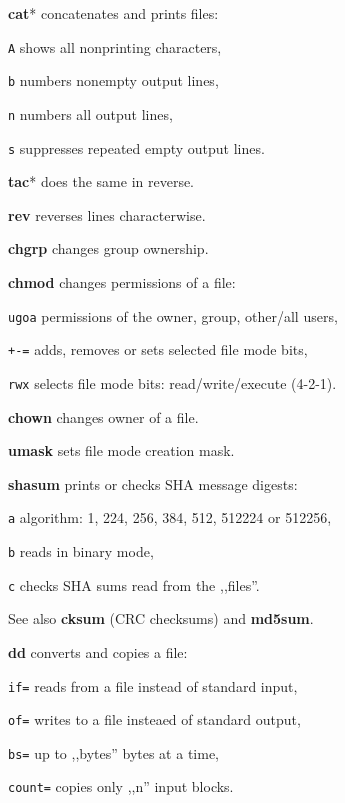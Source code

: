 \begin{enumx}
	\item [\cmd] \textbf{cat}* concatenates and prints files:
	\item [\texttt{A}] shows all nonprinting characters,
	\item [\texttt{b}] numbers nonempty output lines,
	\item [\texttt{n}] numbers all output lines,
	\item [\texttt{s}] suppresses repeated empty output lines.
	\item [\cmd] \textbf{tac}* does the same in reverse.
	\item [\cmd] \textbf{rev} reverses lines characterwise.
\end{enumx}

\begin{enumx}
	\item [\cmd] \textbf{chgrp} changes group ownership.
	
	\item [\cmd] \textbf{chmod} changes permissions of a file:
	\item [\texttt{ugoa}] permissions of the owner, group, other/all users,
	\item [\texttt{+-=}] adds, removes or sets selected file mode bits,
	\item [\texttt{rwx}] selects file mode bits: read/write/execute (4-2-1).
	
	\item [\cmd] \textbf{chown} changes owner of a file.
	
	\item [\cmd] \textbf{umask} sets file mode creation mask.
\end{enumx}

\begin{enumx}
	\item [\cmd] \textbf{shasum} prints or checks SHA message digests:
	\item [\texttt{a}] algorithm: 1, 224, 256, 384, 512, 512224 or 512256,
	\item [\texttt{b}] reads in binary mode,
	\item [\texttt{c}] checks SHA sums read from the ,,files''.

	\item [\cmd] See also \textbf{cksum} (CRC checksums) and \textbf{md5sum}.
\end{enumx}

\begin{enumx}
	\item [\cmd] \textbf{dd} converts and copies a file:
	\item [\texttt{if=}] reads from a file instead of standard input,
	\item [\texttt{of=}] writes to a file insteaed of standard output,
	\item [\texttt{bs=}] up to ,,bytes'' bytes at a time,
	\item [\texttt{count=}] copies only ,,n'' input blocks.
\end{enumx}

